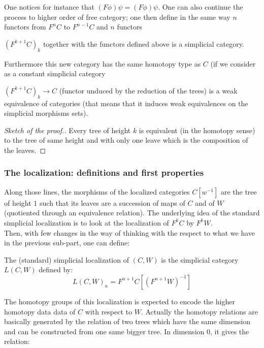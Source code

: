 One notices for instance that $(F \phi) \psi=(F \phi) \psi$. One can also continue the process to higher order of free category; one then define in the same way $n$ functors from $F^n C$ to $F^{n-1} C$ and $n$ functors 

\begin{prop}
$(F^{k+1}C)_k$ together with the functors defined above is a simplicial category.
\end{prop} 

Furthermore this new category has the same homotopy type as $C$ (if we consider as a constant simplicial category

\begin{prop}
$(F^{k+1}C)_k \rightarrow C$ (functor unduced by the reduction of the trees) is a weak equivalence of categories (that means that it induces weak equivalences on the simplicial morphisms sets).
\end{prop} 

\begin{proof}[Sketch of the proof.]
Every tree of height $k$ is equivalent (in the homotopy sense) to the tree of same height and with only one leave which is the composition of the leaves.
\end{proof}

\subsubsection{The localization: definitions and first properties}

Along those lines, the morphisms of the localized categories $C[w^{-1}]$ are the tree of height $1$ such that its leaves are a succession of maps of $C$ and of $W$ (quotiented through an equivalence relation). The underlying idea of the standard simplicial localization is to look at the localization of $F^{k} C$ by $F^{k} W$.\\

Then, with few changes in the way of thinking with the respect to what we have in the previous sub-part, one can define: 

\begin{defin}
The (standard) simplicial localization of $(C,W)$ is the simplicial category $L(C,W)$ defined by:
\begin{equation}
L(C,W)_n=F^{n+1}C[(F^{n+1}W)^{-1}]
\end{equation}
\end{defin}

The homotopy groups of this localization is expected to encode the higher homotopy data data of $C$ with respect to $W$. Actually the homotopy relations are basically generated by the relation of two trees which have the same dimension and can be constructed from one same bigger tree. In dimension $0$, it gives the relation: 

